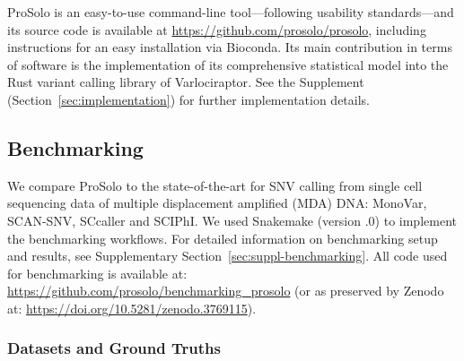 \documentclass[12pt,inline]{wlscirep}
\begin{document}
ProSolo is an easy-to-use command-line tool---following usability standards\cite{taschuk_ten_2017}---and its source code is available at \url{https://github.com/prosolo/prosolo}, including instructions for an easy installation via Bioconda\cite{gruning_bioconda:_2018}.
Its main contribution in terms of software is the implementation of its comprehensive statistical model into the Rust variant calling library of Varlociraptor\cite{koster_varlociraptor_2020}.
See the Supplement (Section~\ref{sec:implementation}) for further implementation details.

\subsection{Benchmarking}

We compare ProSolo to the state-of-the-art for SNV calling from single cell sequencing data of multiple displacement amplified (MDA) DNA: MonoVar\cite{zafar_monovar:_2016}, SCAN-SNV\cite{luquette_identification_2019}, SCcaller\cite{dong_accurate_2017} and SCIPhI\cite{singer_single-cell_2018}. We used Snakemake\cite{koster_snakemakescalable_2012} (version {.0}) to implement the benchmarking workflows.
For detailed information on benchmarking setup and results, see Supplementary Section~\ref{sec:suppl-benchmarking}.
All code used for benchmarking is available at: \url{https://github.com/prosolo/benchmarking_prosolo} (or as preserved by Zenodo at: \url{https://doi.org/10.5281/zenodo.3769115}).

\subsubsection{Datasets and Ground Truths}
\end{document}
